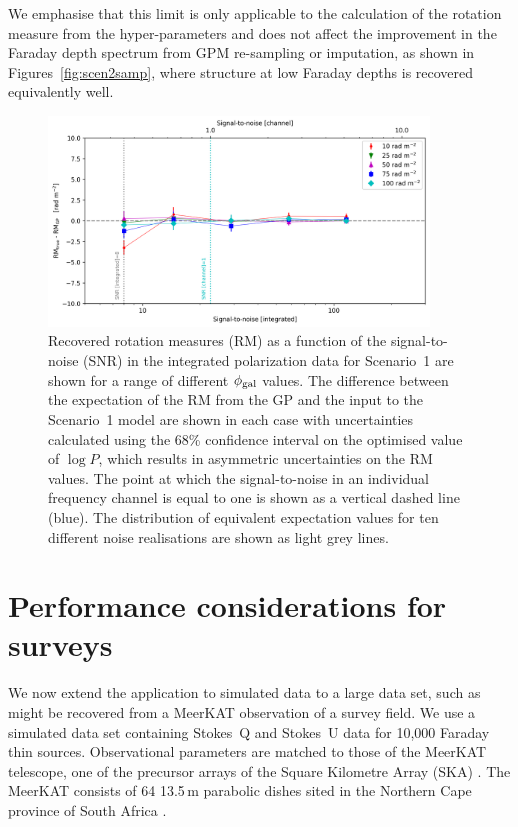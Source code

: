 \documentclass[fleqn,usenatbib]{mnras}
\begin{document}
We emphasise that this limit is only applicable to the calculation of the rotation measure from the hyper-parameters and does not affect the improvement in the Faraday depth spectrum from GPM re-sampling or imputation, as shown in Figures~\ref{fig:scen2samp}, where structure at low Faraday depths is recovered equivalently well.
%
\begin{figure}
\centerline{\includegraphics[width=0.9\textwidth]{./FIGURES/snr.png}}
\caption{\label{fig:rm_snr} Recovered rotation measures (RM) as a function of the signal-to-noise (SNR) in the integrated polarization data for Scenario~1 are shown for a range of different $\phi_{\rm gal}$ values. The difference between the expectation of the RM from the GP and the input to the Scenario~1 model are shown in each case with uncertainties calculated using the 68\% confidence interval on the optimised value of $\log P$, which results in asymmetric uncertainties on the RM values. The point at which the signal-to-noise in an individual frequency channel is equal to one is shown as a vertical dashed line (blue). The distribution of equivalent expectation values for ten different noise realisations are shown as light grey lines.}
\end{figure}



\section{Performance considerations for surveys}
\label{sec:joedata}

We now extend the application to simulated data to a large data set, such as might be recovered from a MeerKAT observation of a survey field. We use a simulated data set containing Stokes~Q and Stokes~U data for 10,000 Faraday thin sources. Observational parameters are matched to those of the MeerKAT telescope, one of the precursor arrays of the Square Kilometre Array (SKA) \citep{5136190, 2009IEEEP..97.1522J}. The MeerKAT consists of 64 13.5\,m parabolic dishes sited in the Northern Cape province of South Africa \citep{Justin,Taylor_2017}. %
\end{document}
